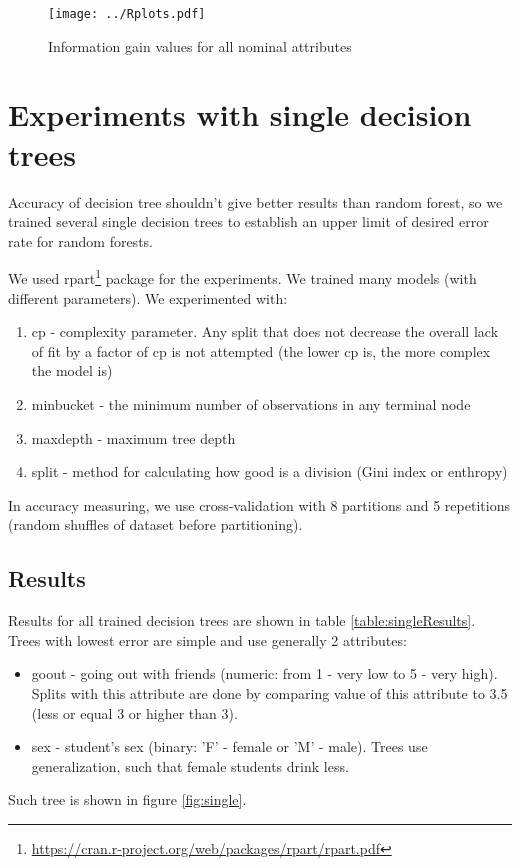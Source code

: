 \documentclass[a4paper]{article}
\begin{document}
\begin{multicols}{2}
\begin{figure}[H]
    \centering
    \texttt{[image: ../Rplots.pdf]}
    \label{fig:nominalIG}
    \caption[]{Information gain values for all nominal attributes}
\end{figure}


\section{Experiments with single decision trees}
\label{expSingle}

Accuracy of decision tree shouldn't give better results than random forest,
so we trained several single decision trees to establish
an upper limit of desired error rate for random forests.

We used rpart\footnote{\url{https://cran.r-project.org/web/packages/rpart/rpart.pdf}} package for the experiments.
We trained many models (with different parameters).
We experimented with:
\begin{enumerate}
    \item cp - complexity parameter.
        Any split that does not decrease the overall lack of fit by a factor of cp is not attempted
        (the lower cp is, the more complex the model is)
    \item minbucket - the minimum number of observations in any terminal node
    \item maxdepth - maximum tree depth
    \item split - method for calculating how good is a division (Gini index or enthropy)
\end{enumerate}
In accuracy measuring, we use cross-validation with 8 partitions
and 5 repetitions (random shuffles of dataset before partitioning).
% 
\subsection{Results}
\label{singleConc}

Results for all trained decision trees are shown in table \ref{table:singleResults}.
Trees with lowest error are simple and use generally 2 attributes:
\begin{itemize}
    \item goout - going out with friends (numeric: from 1 - very low to 5 - very high).
        Splits with this attribute are done by comparing value of this attribute to 3.5
        (less or equal 3 or higher than 3).
    \item sex - student's sex (binary: 'F' - female or 'M' - male).
        Trees use generalization, such that female students drink less.
\end{itemize}
Such tree is shown in figure \ref{fig:single}.


\end{multicols}
\end{document}
